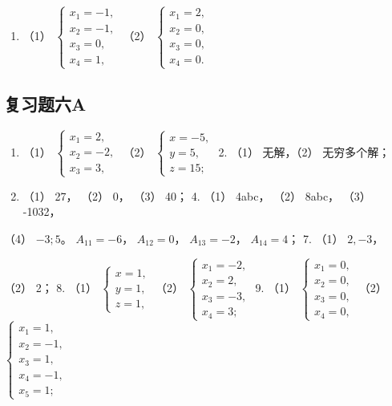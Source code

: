 \begin{enumerate}[start=2]
\item
  （1）
  \(\left\{ \begin{array}{l} x_{1} = -1, \\ x_{2} = -1, \\ x_{3} = 0, \\ x_{4} = 1, \end{array} \right.\)
  （2）
  \(\left\{ \begin{array}{l} x_{1} = 2, \\ x_{2} = 0, \\ x_{3} = 0, \\ x_{4} = 0. \end{array} \right.\)
\end{enumerate}

\subsection{复习题六A}

\begin{enumerate}
\item
  （1）
  \(\left\{ \begin{array}{l} x_{1} = 2, \\ x_{2} = -2, \\ x_{3} = 3, \end{array} \right.\)
  （2）
  \(\left\{ \begin{array}{l} x = -5, \\ y = 5, \\ z = 15; \end{array} \right.\)
  2. （1） 无解，（2） 无穷多个解；
\item
  （1） 27， （2） 0， （3） 40； 4. （1） 4abc， （2） 8abc， （3）
  -1032，
\end{enumerate}

（4） \(-3; 5\)。 \(A_{11} = -6\)， \(A_{12} = 0\)， \(A_{13} = -2\)，
\(A_{14} = 4\)； 7. （1） \(2, -3\)，

（2） 2； 8. （1）
\(\left\{ \begin{array}{l} x = 1, \\ y = 1, \\ z = 1, \end{array} \right.\)
（2）
\(\left\{ \begin{array}{l} x_1 = -2, \\ x_2 = 2, \\ x_3 = -3, \\ x_4 = 3; \end{array} \right.\)
9. （1）
\(\left\{ \begin{array}{l} x_1 = 0, \\ x_2 = 0, \\ x_3 = 0, \\ x_4 = 0, \end{array} \right.\)
（2）
\(\left\{ \begin{array}{l} x_1 = 1, \\ x_2 = -1, \\ x_3 = 1, \\ x_4 = -1, \\ x_5 = 1; \end{array} \right.\)

